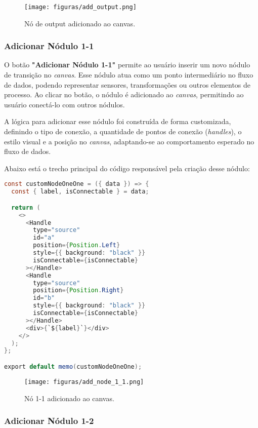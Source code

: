 \begin{figure}[htbp]
    \centering
    \texttt{[image: figuras/add\_output.png]}
    \caption{Nó de output adicionado ao canvas.}
    \label{Fig:AddOutput}
\end{figure}

\subsubsection{Adicionar Nódulo 1-1}

O botão \textbf{"Adicionar Nódulo 1-1"} permite ao usuário inserir um novo nódulo de transição no \textit{canvas}. Esse nódulo atua como um ponto intermediário no fluxo de dados, podendo representar sensores, transformações ou outros elementos de processo. Ao clicar no botão, o nódulo é adicionado ao \textit{canvas}, permitindo ao usuário conectá-lo com outros nódulos.

A lógica para adicionar esse nódulo foi construída de forma customizada, definindo o tipo de conexão, a quantidade de pontos de conexão (\textit{handles}), o estilo visual e a posição no \textit{canvas}, adaptando-se ao comportamento esperado no fluxo de dados.

Abaixo está o trecho principal do código responsável pela criação desse nódulo:

\begin{lstlisting}[language=Java, caption=Nódulo customizado 1-1]
const customNodeOneOne = ({ data }) => {
  const { label, isConnectable } = data;

  return (
    <>
      <Handle
        type="source"
        id="a"
        position={Position.Left}
        style={{ background: "black" }}
        isConnectable={isConnectable}
      ></Handle>
      <Handle
        type="source"
        position={Position.Right}
        id="b"
        style={{ background: "black" }}
        isConnectable={isConnectable}
      ></Handle>
      <div>{`${label}`}</div>
    </>
  );
};

export default memo(customNodeOneOne);
\end{lstlisting}

\begin{figure}[htbp]
    \centering
    \texttt{[image: figuras/add\_node\_1\_1.png]}
    \caption{Nó 1-1 adicionado ao canvas.}
    \label{Fig:AddNode1to1}
\end{figure}

\subsubsection{Adicionar Nódulo 1-2}

